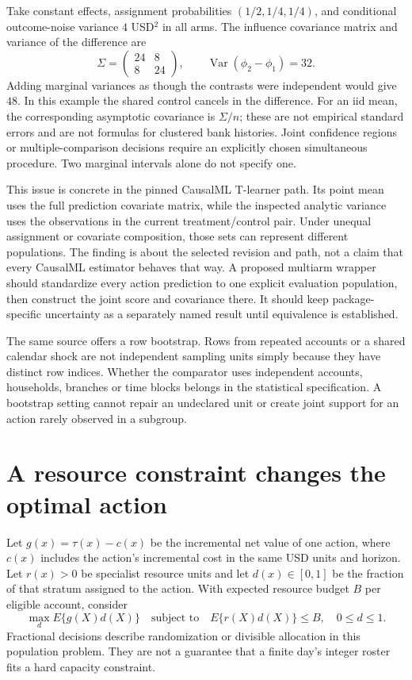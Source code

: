 Take constant effects, assignment probabilities $(1/2,1/4,1/4)$, and
conditional outcome-noise variance $4$ USD$^2$ in all arms. The influence
covariance matrix and variance of the difference are
\[
 \Sigma=\begin{pmatrix}24&8\\8&24\end{pmatrix},\qquad
 \operatorname{Var}(\phi_2-\phi_1)=32.
\]
Adding marginal variances as though the contrasts were independent would give
$48$. In this example the shared control cancels in the difference. For an
iid mean, the corresponding asymptotic covariance is $\Sigma/n$; these are
not empirical standard errors and are not formulas for clustered bank
histories. Joint confidence regions or multiple-comparison decisions require
an explicitly chosen simultaneous procedure. Two marginal intervals alone
do not specify one.~\citep{exec17_s4_math}

This issue is concrete in the pinned CausalML T-learner path. Its point mean
uses the full prediction covariate matrix, while the inspected analytic
variance uses the observations in the current treatment/control pair. Under
unequal assignment or covariate composition, those sets can represent
different populations. The finding is about the selected revision and path,
not a claim that every CausalML estimator behaves that way. A proposed
multiarm wrapper should standardize every action prediction to one explicit
evaluation population, then construct the joint score and covariance there.
It should keep package-specific uncertainty as a separately named result
until equivalence is established.~\citep{exec14_causalml_primary,exec17_s4_paths}

The same source offers a row bootstrap. Rows from repeated accounts or a
shared calendar shock are not independent sampling units simply because they
have distinct row indices. Whether the comparator uses independent accounts,
households, branches or time blocks belongs in the statistical specification.
A bootstrap setting cannot repair an undeclared unit or create joint support
for an action rarely observed in a subgroup.

\section{A resource constraint changes the optimal action}
\label{exec17:s4-allocation}

Let $g(x)=\tau(x)-c(x)$ be the incremental net value of one action, where
$c(x)$ includes the action's incremental cost in the same USD units and
horizon. Let $r(x)>0$ be specialist resource units and let $d(x)\in[0,1]$
be the fraction of that stratum assigned to the action. With expected
resource budget $B$ per eligible account, consider
\begin{equation}
 \max_d E\{g(X)d(X)\}\quad\text{subject to}\quad
 E\{r(X)d(X)\}\leq B,\quad 0\leq d\leq1.
 \label{exec17:s4-resource-problem}
\end{equation}
Fractional decisions describe randomization or divisible allocation in this
population problem. They are not a guarantee that a finite day's integer
roster fits a hard capacity constraint.

